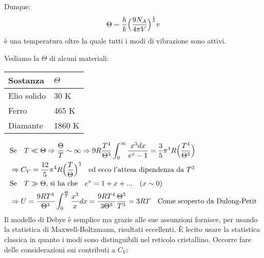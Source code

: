 Dunque:
\begin{equation}
\Theta = \frac{ h}{k } \Bigl(  \frac{ 9N_A}{4 \pi V }  \Bigr)^{ \frac{ 1}{3 } } v
\end{equation}
è una temperatura oltre la quale tutti i modi di vibrazione sono attivi.

Vediamo la $\Theta$ di alcuni materiali:
\begin{table}[h]
\centering
\begin{tabular}{|l|l|}
\hline
\textbf{Sostanza}    & \textbf{$\Theta$} \\ \hline
Elio solido & 30 K     \\ \hline
Ferro       & 465 K    \\ \hline
Diamante    & 1860 K   \\ \hline
\end{tabular}
\end{table}


\begin{equation}
\begin{split}
& \mbox{Se} \quad T \ll \Theta \Rightarrow \frac{ \Theta}{T } \sim \infty \Rightarrow 9R \frac{ T^4}{\Theta^3} \int_0^{\infty} \frac{ x^3 dx}{e^x - 1} = \frac{ 3}{5 } \pi^4 R \Bigl(  \frac{ T^4}{ \Theta^3}  \Bigr) \\
& \Rightarrow C_V = \frac{ 12}{5 } \pi^4 R \Bigl(  \frac{ T}{\Theta }  \Bigr)^3 \quad \mbox{ed ecco l'attesa dipendenza da $T^3$} \\
& \mbox{Se} \quad T \gg \Theta \mbox{, si ha che} \quad e^x = 1 + x + ... \quad (x \sim 0) \\
& \Rightarrow U = \frac{ 9R T^4}{\Theta^3 } \int_0^{\frac{ \Theta}{ T}} \frac{ x^3}{x }dx = \frac{ 9 R T^4}{3 \Theta^3 } \frac{ \Theta^3}{T^3 } = 3RT \quad \mbox{Come scoperto da Dulong-Petit}
\end{split}
\end{equation}
Il modello di Debye è semplice ma grazie alle sue assunzioni fornisce, per usando la statistica di Maxwell-Boltzmann, risultati eccellenti.
È lecito usare la statistica classica in quanto i modi sono distinguibili nel reticolo cristallino.
Occorre fare delle considerazioni sui contributi a $C_V$:

